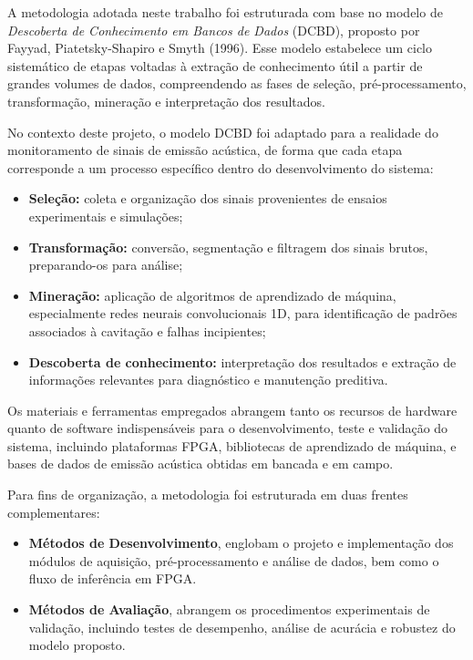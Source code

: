 A metodologia adotada neste trabalho foi estruturada com base no modelo de \textit{Descoberta de Conhecimento em Bancos de Dados} (DCBD), proposto por Fayyad, Piatetsky-Shapiro e Smyth (1996). Esse modelo estabelece um ciclo sistemático de etapas voltadas à extração de conhecimento útil a partir de grandes volumes de dados, compreendendo as fases de seleção, pré-processamento, transformação, mineração e interpretação dos resultados.

No contexto deste projeto, o modelo DCBD foi adaptado para a realidade do monitoramento de sinais de emissão acústica, de forma que cada etapa corresponde a um processo específico dentro do desenvolvimento do sistema:
\begin{itemize}
    \item \textbf{Seleção:} coleta e organização dos sinais provenientes de ensaios experimentais e simulações;
    \item \textbf{Transformação:} conversão, segmentação e filtragem dos sinais brutos, preparando-os para análise;
    \item \textbf{Mineração:} aplicação de algoritmos de aprendizado de máquina, especialmente redes neurais convolucionais 1D, para identificação de padrões associados à cavitação e falhas incipientes;
    \item \textbf{Descoberta de conhecimento:} interpretação dos resultados e extração de informações relevantes para diagnóstico e manutenção preditiva.
\end{itemize}

Os materiais e ferramentas empregados abrangem tanto os recursos de hardware quanto de software indispensáveis para o desenvolvimento, teste e validação do sistema, incluindo plataformas FPGA, bibliotecas de aprendizado de máquina, e bases de dados de emissão acústica obtidas em bancada e em campo.

Para fins de organização, a metodologia foi estruturada em duas frentes complementares:
\begin{itemize}
    \item \textbf{Métodos de Desenvolvimento}, englobam o projeto e implementação dos módulos de aquisição, pré-processamento e análise de dados, bem como o fluxo de inferência em FPGA.
    \item \textbf{Métodos de Avaliação}, abrangem os procedimentos experimentais de validação, incluindo testes de desempenho, análise de acurácia e robustez do modelo proposto.
\end{itemize}

